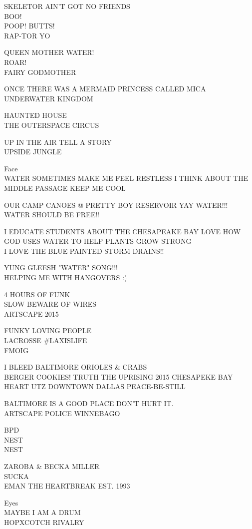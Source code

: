 \documentclass[10pt,letterpaper]{article}
\begin{document}
SKELETOR AIN'T GOT NO FRIENDS\\
BOO!\\
POOP!  BUTTS!\\
RAP{-}TOR YO

QUEEN MOTHER WATER!\\
ROAR!\\
FAIRY GODMOTHER

ONCE THERE WAS A MERMAID PRINCESS CALLED MICA\\
UNDERWATER KINGDOM

HAUNTED HOUSE\\
THE OUTERSPACE CIRCUS

UP IN THE AIR TELL A STORY\\
UPSIDE JUNGLE

Face\\
WATER SOMETIMES MAKE ME FEEL RESTLESS I THINK ABOUT THE MIDDLE PASSAGE KEEP ME COOL

OUR CAMP CANOES @ PRETTY BOY RESERVOIR YAY WATER!!!\\
WATER SHOULD BE FREE!!

I EDUCATE STUDENTS ABOUT THE CHESAPEAKE BAY LOVE HOW GOD USES WATER TO HELP PLANTS GROW STRONG\\
I LOVE THE BLUE PAINTED STORM DRAINS!!

YUNG GLEESH "WATER" SONG!!!\\
HELPING ME WITH HANGOVERS :)

4 HOURS OF FUNK\\
SLOW BEWARE OF WIRES\\
ARTSCAPE 2015

FUNKY LOVING PEOPLE\\
LACROSSE \#LAXISLIFE\\
FMOIG

I BLEED BALTIMORE ORIOLES \& CRABS\\
BERGER COOKIES!  TRUTH THE UPRISING 2015 CHESAPEKE BAY HEART UTZ DOWNTOWN DALLAS PEACE{-}BE{-}STILL

BALTIMORE IS A GOOD PLACE DON'T HURT IT.\\
ARTSCAPE POLICE WINNEBAGO

BPD\\
NEST\\
NEST

ZAROBA \& BECKA MILLER\\
SUCKA\\
EMAN THE HEARTBREAK EST. 1993

Eyes\\
MAYBE I AM A DRUM\\
HOPXCOTCH RIVALRY
\end{document}
